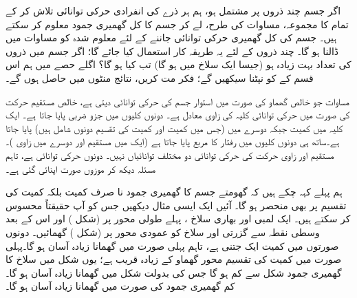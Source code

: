 اگر جسم چند ذروں پر مشتمل  ہو، ہم ہر ذرے کی انفرادی حرکی توانائی    تلاش کر کے تمام کا مجموعہ، مساوات   کی طرح، لے کر جسم کا  کل گھمیری جمود  معلوم کر سکتے ہیں۔ جسم کی کل گھمیری حرکی توانائی جاننے  کے لئے    معلوم شدہ  کو   مساوات  میں ڈالنا ہو گا۔ چند ذروں کے لئے یہ  طریقہ کار استعمال کیا جائے گا؛   اگر جسم  میں ذروں کی تعداد بہت زیادہ  ہو (جیسا ایک سلاخ میں ہو گا) تب  کیا ہو گا؟ اگلے حصے میں ہم  اس  قسم کے  کو نپٹنا سیکھیں گے؛ فکر  مت کریں، نتائج منٹوں میں حاصل ہوں گے۔

مساوات  جو  خالص گھماو کی صورت میں استوار جسم کی حرکی توانائی  دیتی ہے،  خالص مستقیم حرکت کی صورت میں حرکی توانائی  کلیہ  کی  زاوی  معادل  ہے۔ دونوں کلیوں میں  جزو ضربی پایا جاتا ہے۔ ایک کلیہ میں کمیت   جبکہ دوسرے میں  (جس میں کمیت اور  کمیت  کی تقسیم  دونوں شامل ہیں)  پایا جاتا ہے۔ساتھ ہی دونوں کلیوں میں رفتار کا مربع پایا جاتا ہے (ایک میں مستقیم اور دوسرے میں زاوی )۔ مستقیم اور زاوی حرکت کی حرکی توانائی دو مختلف توانائیاں نہیں۔ دونوں حرکی توانائی ہے، تاہم مسئلہ دیکھ کر موزوں صورت اپنائی   گئی ہے۔

ہم پہلے کہہ چکے ہیں  کہ گھومتے  جسم کا گھمیری جمود نا صرف کمیت بلکہ کمیت کی تقسیم پر بھی منحصر ہو گا۔ آئیں ایک ایسی مثال دیکھیں جس کو آپ حقیقتاً محسوس کر  سکتے ہیں۔ ایک   لمبی   اور بھاری  سلاخ ، پہلے   طولی  محور پر (شکل )    اور اس کے  بعد  وسطی نقطہ سے گزرتی    اور سلاخ کو عمودی   محور  پر  (شکل ) گھمائیں۔  دونوں صورتوں  میں کمیت  ایک جتنی ہے، تاہم  پہلی صورت میں گھمانا زیادہ  آسان ہو گا۔پہلی صورت میں  کمیت  کی تقسیم محور گھماو کے  زیادہ قریب ہے؛ یوں شکل  میں سلاخ کا گھمیری جمود شکل  سے کم ہو گا جس کی بدولت شکل  میں گھمانا زیادہ آسان ہو گا۔ کم گھمیری جمود  کی صورت میں گھمانا زیادہ آسان ہو گا۔

